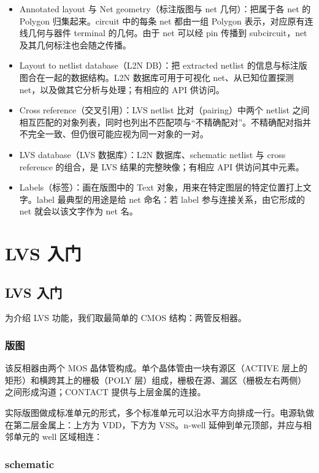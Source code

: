 \begin{itemize}
\item Annotated layout 与 Net geometry（标注版图与 net 几何）：把属于各 net 的 Polygon 归集起来。circuit 中的每条 net 都由一组 Polygon 表示，对应原有连线几何与器件 terminal 的几何。由于 net 可以经 pin 传播到 subcircuit，net 及其几何标注也会随之传播。
\item Layout to netlist database（L2N DB）：把 extracted netlist 的信息与标注版图合在一起的数据结构。L2N 数据库可用于可视化 net、从已知位置探测 net，以及做其它分析与处理；有相应的 API 供访问。
\item Cross reference（交叉引用）：LVS netlist 比对（pairing）中两个 netlist 之间相互匹配的对象列表，同时也列出不匹配项与“不精确配对”。不精确配对指并不完全一致、但仍很可能应视为同一对象的一对。
\item LVS database（LVS 数据库）：L2N 数据库、schematic netlist 与 cross reference 的组合，是 LVS 结果的完整映像；有相应 API 供访问其中元素。
\item Labels（标签）：画在版图中的 Text 对象，用来在特定图层的特定位置打上文字。label 最典型的用途是给 net 命名：若 label 参与连接关系，由它形成的 net 就会以该文字作为 net 名。
\end{itemize}

\section{LVS 入门}\label{sec:lvs_intro}

\subsection{LVS 入门}

为介绍 LVS 功能，我们取最简单的 CMOS 结构：两管反相器。

\subsubsection{版图}

该反相器由两个 MOS 晶体管构成。单个晶体管由一块有源区（ACTIVE 层上的矩形）和横跨其上的栅极（POLY 层）组成，栅极在源、漏区（栅极左右两侧）之间形成沟道；CONTACT 提供与上层金属的连接。

实际版图做成标准单元的形式，多个标准单元可以沿水平方向排成一行。电源轨做在第二层金属上：上方为 VDD，下方为 VSS。n-well 延伸到单元顶部，并应与相邻单元的 well 区域相连：


\subsubsection{schematic}

